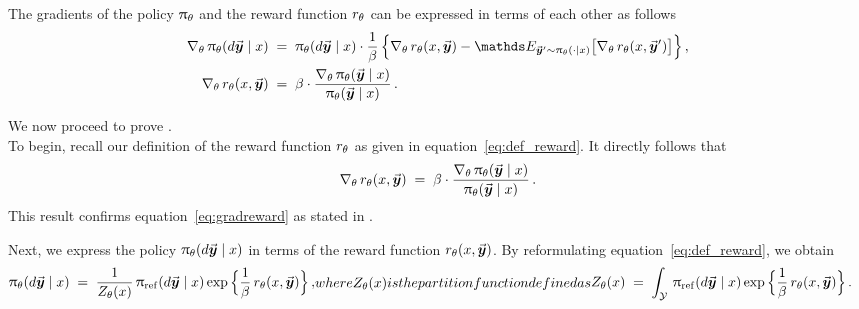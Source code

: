 			\begin{lemma}
			\label{lemma:grad_policy}
			The gradients of the policy $\uppi_{\theta}$ and the reward function $r_{\theta}$ can be expressed in terms of each other as follows
			\begin{subequations}
				\begin{align}
					\label{eq:gradpolicy}
					\gradtheta \policytheta(\diff \response \mid \prompt)
					& \; = \;  \policytheta(\diff \response \mid \prompt) \cdot \frac{1}{\parabeta} \,
					\Big\{ \gradtheta \rewardtheta(\prompt, \response) - \Exp_{\responsenew \sim \policytheta(\cdot \mid \prompt)}\big[ \gradtheta \rewardtheta(\prompt, \responsenew) \big] \Big\} \, ,  \\
					\label{eq:gradreward}
					\gradtheta \rewardtheta (\prompt, \response)
					& \; = \; \parabeta \cdot \frac{\gradtheta \policytheta(\response \mid \prompt)}{\policytheta(\response \mid \prompt)} \, .
				\end{align}
			\end{subequations}
		\end{lemma}
		
		We now proceed to prove .  \\
		
		To begin, recall our definition of the reward function $r_{\theta}$ as given in equation~\eqref{eq:def_reward}.
		It directly follows that
		\begin{align*}
			\nabla_{\theta} \,  r_{\theta} (x, \vec{\boldsymbol{y}}\!\,)
			\; = \; \beta \cdot \frac{\nabla_{\theta} \,  \uppi_{\theta}(\vec{\boldsymbol{y}}\!\, \mid x)}{\uppi_{\theta}(\vec{\boldsymbol{y}}\!\, \mid x)} \, .
		\end{align*}
		This result confirms equation~\eqref{eq:gradreward} as stated in .
		
		Next, we express the policy $\uppi_{\theta}({d } \vec{\boldsymbol{y}}\!\, \mid x)$ in terms of the reward function $r_{\theta}(x, \vec{\boldsymbol{y}}\!\,)$. By reformulating equation~\eqref{eq:def_reward}, we obtain
		\begin{subequations}
		\begin{align}
			\label{eq:policyfromreward}
			\policytheta(\diff \response \mid \prompt)
			\; = \; \frac{1}{\Partitiontheta (\prompt)} \, \policyref(\diff \response \mid \prompt)
			\exp \Big\{ \frac{1}{\parabeta} \, \rewardtheta(\prompt, \response) \Big\} \, ,
		\end{align}
		where $\Partitiontheta (\prompt)$ is the partition function defined as
		\begin{align}
			\label{eq:def_Partition}
			\Partitiontheta (\prompt)
			& \; = \; \int_{\ResponseSp} \, \policyref(\diff \response \mid \prompt)
			\exp \Big\{ \frac{1}{\parabeta} \, \rewardtheta(\prompt, \response) \Big\} \, .
		\end{align}
		\end{subequations}
		
